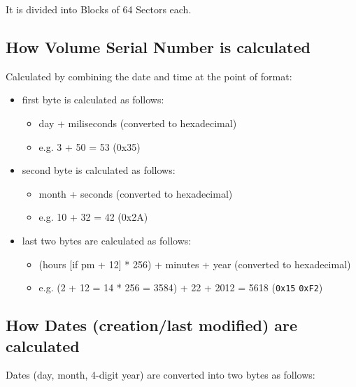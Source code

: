         It is divided into Blocks of 64 Sectors each.

    \subsection{How Volume Serial Number is calculated}
    Calculated by combining the date and time at the point of format:

    \begin{itemize}
        \item first byte is calculated as follows:
        \begin{itemize}
            \item day + miliseconds (converted to hexadecimal)
            \item e.g. 3 + 50 = 53 (0x35)
        \end{itemize}
        \item second byte is calculated as follows:
        \begin{itemize}
            \item month + seconds (converted to hexadecimal)
            \item e.g. 10 + 32 = 42 (0x2A)
        \end{itemize}
        \item last two bytes are calculated as follows:
        \begin{itemize}
            \item (hours [if pm + 12] * 256) + minutes + year (converted to
            hexadecimal)
            \item e.g. (2 + 12 = 14 * 256 = 3584) + 22 + 2012 = 5618
            (\texttt{0x15} \texttt{0xF2})
        \end{itemize}
    \end{itemize}

    \subsection{How Dates (creation/last modified) are calculated}

    Dates (day, month, 4-digit year) are converted into two bytes as follows:

